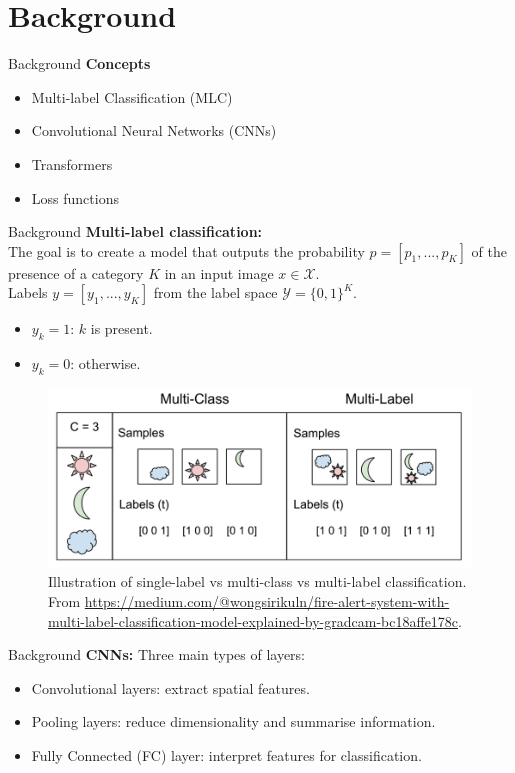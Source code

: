 \section{Background}


\begin{frame}{Background}
  \textbf{Concepts}
  \begin{itemize}
    \item Multi-label Classification (MLC) 
    \item Convolutional Neural Networks (CNNs)
    \item Transformers
    \item Loss functions
  \end{itemize}
\end{frame}


\begin{frame}{Background}
  \textbf{Multi-label classification:}\\
  The goal is to create a model that outputs the probability $p=[p_1,...,p_K]$ of the presence of a category $K$ in an input image $x\in \mathcal{X}$. \\
  Labels $y=[y_1,...,y_K]$ from the label space $\mathcal{Y}=\{0,1\}^K$.
  \begin{itemize}
    \item $y_k=1$: $k$ is present.
    \item $y_k=0$: otherwise.
  \end{itemize}  
      \vfill
    \begin{figure}[b]
        \centering
        \includegraphics[width=0.6\linewidth]{Images/mlc.png}
        \caption*{\tiny Illustration of single-label vs multi-class vs multi-label classification. 
        From \url{https://medium.com/@wongsirikuln/fire-alert-system-with-multi-label-classification-model-explained-by-gradcam-bc18affe178c}.}
    \end{figure}
\end{frame}


\begin{frame}{Background}
  \textbf{CNNs:} Three main types of layers:
  \begin{itemize}
    \item Convolutional layers: extract spatial features.
    \item Pooling layers: reduce dimensionality and summarise information.
    \item Fully Connected (FC) layer: interpret features for classification.
  \end{itemize}
\end{frame}

